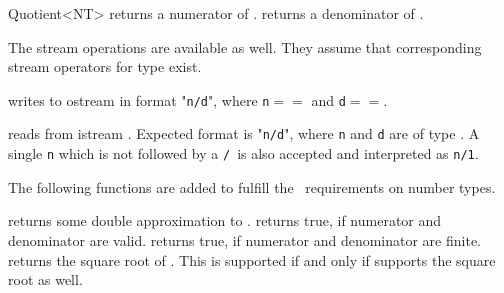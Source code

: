 \begin{ccRefClass} {Quotient<NT>}
       {returns a numerator of .}
\ccGlue
{}
       {returns a denominator of .}

\ccHidden {}
{}

The stream operations are available as well. 
They assume that corresponding stream operators for type  exist.

       {writes  to ostream  in format "{\tt n/d}", where
       {\tt n}$==$ and {\tt d}$==$.}

       {reads  from istream . Expected format is
        "{\tt n/d}", where {\tt n} and {\tt d} are of type .
        A single {\tt n} which is not followed by a {\tt /}\  is also
        accepted and interpreted as {\tt n/1}.}

The following functions are added to fulfill the \cgal\ requirements
on number types.

       {returns some double approximation to .}
\ccGlue
{}
       {returns true, if numerator and denominator are valid.}
\ccGlue
{}
       {returns true, if numerator and denominator are finite.}
\ccGlue
{}
       {returns the square root of .  This is supported if and only if
         supports the square root as well.}

\end{ccRefClass} 
